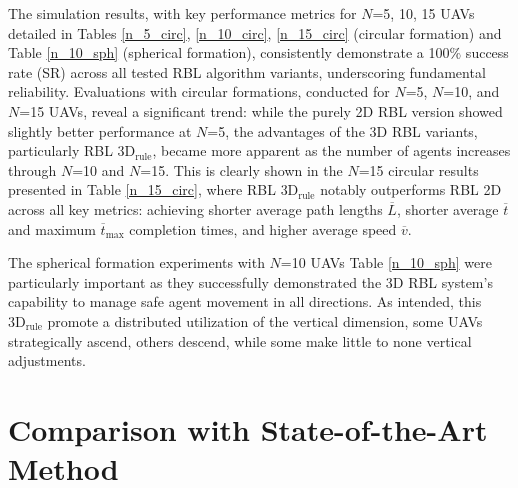         The simulation results, with key performance metrics for $N$=5, 10, 15 \ac{UAV}s detailed in Tables \ref{n_5_circ}, \ref{n_10_circ}, \ref{n_15_circ} (circular formation) and Table \ref{n_10_sph} (spherical formation), consistently demonstrate a 100$\%$ success rate (SR) across all tested \ac{RBL} algorithm variants, underscoring fundamental reliability. 
        Evaluations with circular formations, conducted for $N$=5, $N$=10, and $N$=15 \ac{UAV}s, reveal a significant trend: while the purely 2D \ac{RBL} version showed slightly better performance at $N$=5, the advantages of the 3D \ac{RBL} variants, particularly \ac{RBL} $\text{3D}_{\text{rule}}$, became more apparent as the number of agents increases through $N$=10 and $N$=15. 
        This is clearly shown in the $N$=15 circular results presented in Table \ref{n_15_circ}, where \ac{RBL} $\text{3D}_{\text{rule}}$ notably outperforms \ac{RBL} 2D across all key metrics: achieving shorter average path lengths $\overline{L}$, shorter average $\overline{t}$ and maximum $\overline{t}_{\text{max}}$ completion times, and higher average speed $\overline{v}$.

        The spherical formation experiments with $N$=10 \ac{UAV}s Table \ref{n_10_sph} were particularly important as they successfully demonstrated the 3D \ac{RBL} system's capability to manage safe agent movement in all directions. 
        As intended, this $\text{3D}_{\text{rule}}$ promote a distributed utilization of the vertical dimension, some \ac{UAV}s strategically ascend, others descend, while some make little to none vertical adjustments. 
        
    \section{Comparison with State-of-the-Art Method}

